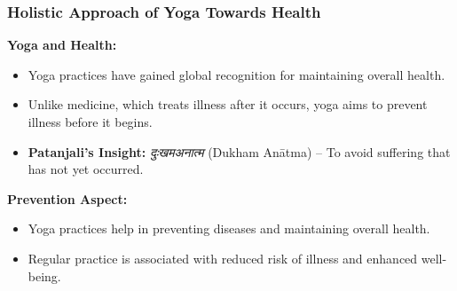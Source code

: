         



\begin{frame}[fragile]\frametitle{Holistic Approach of Yoga Towards Health}
    \textbf{Yoga and Health:}
    \begin{itemize}
        \item Yoga practices have gained global recognition for maintaining overall health.
        \item Unlike medicine, which treats illness after it occurs, yoga aims to prevent illness before it begins.
        \item \textbf{Patanjali's Insight:} \textit{दुःखमअनात्म} (Dukham Anātma) – To avoid suffering that has not yet occurred.
    \end{itemize}

    \textbf{Prevention Aspect:}
    \begin{itemize}
        \item Yoga practices help in preventing diseases and maintaining overall health.
        \item Regular practice is associated with reduced risk of illness and enhanced well-being.
    \end{itemize}
\end{frame}


